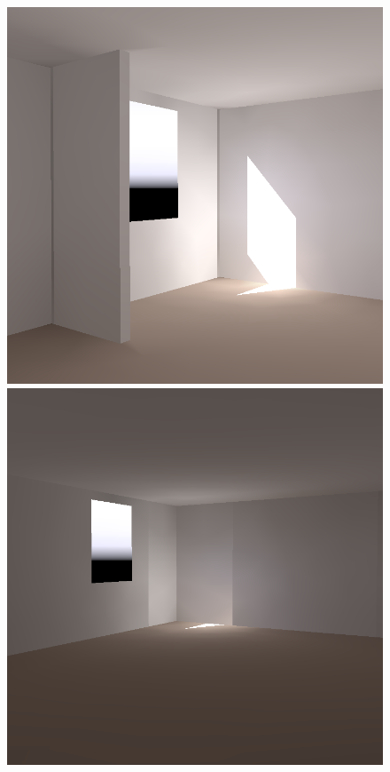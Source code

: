 \begin{figure}[t]
\includegraphics[width=\figwidth]{p2r_031_camera_chris_march.png} \hfill   %
\includegraphics[width=\figwidth]{p2r_014_camera_chris_march.png}\vspace{-0.13in}\\   %


\end{figure}
